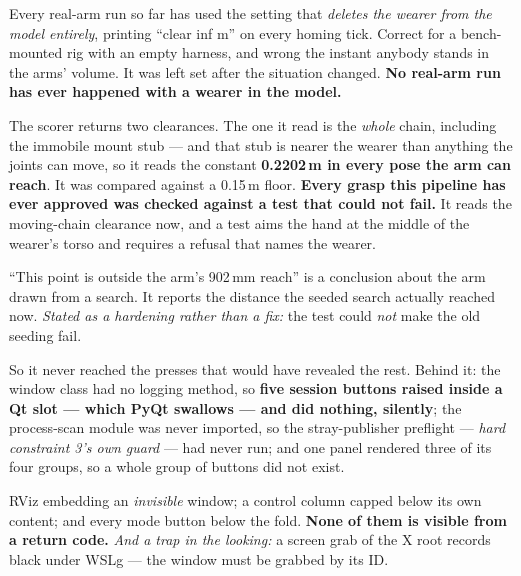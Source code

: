 {Every real-arm run so far has used the setting that \emph{deletes the wearer
from the model entirely}, printing ``clear inf m'' on every homing tick. Correct
for a bench-mounted rig with an empty harness, and wrong the instant anybody
stands in the arms' volume. It was left set after the situation changed.
\textbf{No real-arm run has ever happened with a wearer in the model.}}


{The scorer returns two clearances. The one it read is the \emph{whole} chain,
including the immobile mount stub --- and that stub is nearer the wearer than
anything the joints can move, so it reads the constant \textbf{0.2202\,m in
every pose the arm can reach}. It was compared against a 0.15\,m floor.
\textbf{Every grasp this pipeline has ever approved was checked against a test
that could not fail.} It reads the moving-chain clearance now, and a test aims
the hand at the middle of the wearer's torso and requires a refusal that names
the wearer.}

{``This point is outside the arm's 902\,mm reach'' is a conclusion about the arm
drawn from a search. It reports the distance the seeded search actually reached
now. \textit{Stated as a hardening rather than a fix:} the test could \emph{not}
make the old seeding fail.}

{So it never reached the presses that would have revealed the rest. Behind it:
the window class had no logging method, so \textbf{five session buttons raised
inside a Qt slot --- which PyQt swallows --- and did nothing, silently}; the
process-scan module was never imported, so the stray-publisher preflight ---
\emph{hard constraint 3's own guard} --- had never run; and one panel rendered
three of its four groups, so a whole group of buttons did not exist.}

{RViz embedding an \emph{invisible} window; a control column capped below its own
content; and every mode button below the fold. \textbf{None of them is visible
from a return code.} \textit{And a trap in the looking:} a screen grab of the X
root records black under WSLg --- the window must be grabbed by its ID.}

